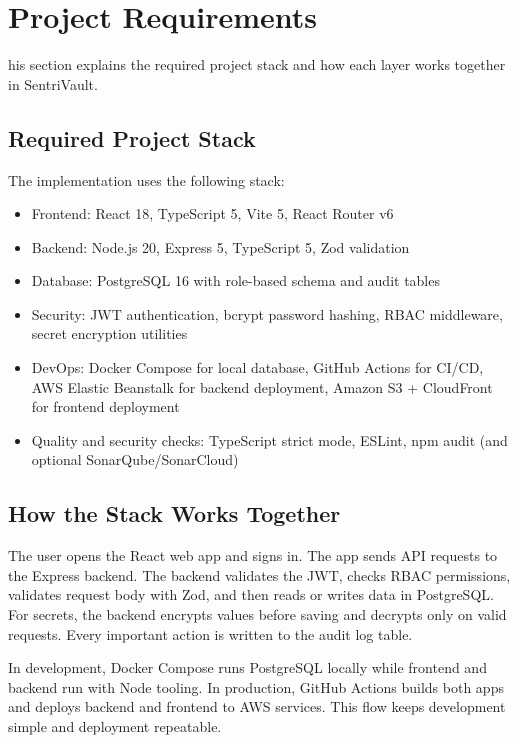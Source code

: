 \documentclass[conference]{IEEEtran}
\begin{document}
\section{Project Requirements}
\label{sec:requirements}

\lettrine[findent=2pt]{}{ }his section explains the required project stack and how each layer works together in SentriVault.

\subsection{Required Project Stack}

The implementation uses the following stack:

\begin{itemize}
  \item Frontend: React 18, TypeScript 5, Vite 5, React Router v6
  \item Backend: Node.js 20, Express 5, TypeScript 5, Zod validation
  \item Database: PostgreSQL 16 with role-based schema and audit tables
  \item Security: JWT authentication, bcrypt password hashing, RBAC middleware, secret encryption utilities
  \item DevOps: Docker Compose for local database, GitHub Actions for CI/CD, AWS Elastic Beanstalk for backend deployment, Amazon S3 + CloudFront for frontend deployment
  \item Quality and security checks: TypeScript strict mode, ESLint, npm audit (and optional SonarQube/SonarCloud)
\end{itemize}

\subsection{How the Stack Works Together}

The user opens the React web app and signs in. The app sends API requests to the Express backend. The backend validates the JWT, checks RBAC permissions, validates request body with Zod, and then reads or writes data in PostgreSQL. For secrets, the backend encrypts values before saving and decrypts only on valid requests. Every important action is written to the audit log table.

In development, Docker Compose runs PostgreSQL locally while frontend and backend run with Node tooling. In production, GitHub Actions builds both apps and deploys backend and frontend to AWS services. This flow keeps development simple and deployment repeatable.
\end{document}

